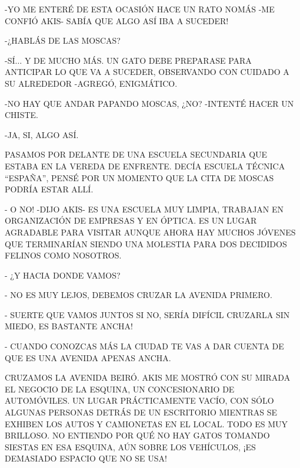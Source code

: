 -YO ME ENTERÉ DE ESTA OCASIÓN HACE UN RATO NOMÁS -ME CONFIÓ AKIS- SABÍA QUE ALGO ASÍ IBA  A SUCEDER! 

-¿HABLÁS DE LAS MOSCAS?

-SÍ$\ldots$ Y DE MUCHO MÁS. UN GATO DEBE PREPARASE PARA ANTICIPAR LO QUE VA A SUCEDER, OBSERVANDO CON CUIDADO A SU ALREDEDOR -AGREGÓ, ENIGMÁTICO.

-NO HAY QUE ANDAR PAPANDO MOSCAS, ¿NO? -INTENTÉ HACER UN CHISTE.




\newpage
{}
-JA, SI, ALGO ASÍ.

PASAMOS POR DELANTE DE UNA ESCUELA SECUNDARIA QUE ESTABA EN LA VEREDA DE ENFRENTE. DECÍA ESCUELA TÉCNICA ``ESPAÑA'', PENSÉ POR UN MOMENTO QUE LA CITA DE MOSCAS PODRÍA ESTAR ALLÍ.

- O NO! -DIJO AKIS- ES UNA ESCUELA MUY LIMPIA, TRABAJAN EN ORGANIZACIÓN DE EMPRESAS Y EN ÓPTICA. ES UN LUGAR AGRADABLE PARA VISITAR AUNQUE AHORA HAY MUCHOS JÓVENES QUE TERMINARÍAN SIENDO UNA MOLESTIA PARA DOS DECIDIDOS FELINOS COMO NOSOTROS.

- ¿Y HACIA DONDE VAMOS?

- NO ES MUY LEJOS, DEBEMOS CRUZAR LA AVENIDA PRIMERO.

- SUERTE QUE VAMOS JUNTOS SI NO, SERÍA DIFÍCIL CRUZARLA SIN MIEDO, ES BASTANTE ANCHA!

- CUANDO CONOZCAS MÁS LA CIUDAD TE VAS A DAR CUENTA DE QUE ES UNA AVENIDA APENAS ANCHA.



\newpage
{}
\newpage
{}
CRUZAMOS LA AVENIDA BEIRÓ. AKIS ME MOSTRÓ CON SU MIRADA EL NEGOCIO DE LA ESQUINA, UN CONCESIONARIO DE AUTOMÓVILES. UN LUGAR PRÁCTICAMENTE VACÍO, CON SÓLO ALGUNAS PERSONAS DETRÁS DE UN ESCRITORIO MIENTRAS SE EXHIBEN LOS AUTOS Y CAMIONETAS EN EL LOCAL. TODO ES MUY BRILLOSO. NO ENTIENDO POR QUÉ NO HAY  GATOS TOMANDO SIESTAS EN ESA ESQUINA, AÚN SOBRE LOS VEHÍCULOS, ¡ES DEMASIADO ESPACIO QUE NO SE USA!

